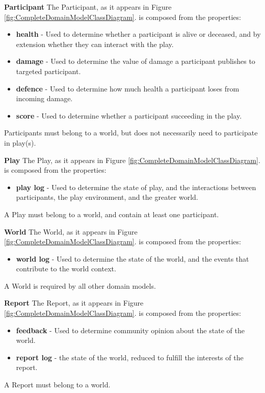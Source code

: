 \textbf{Participant}
\newline
The Participant, as it appears in Figure \ref{fig:CompleteDomainModelClassDiagram}. is composed from the properties:
\begin{itemize}
\item \textbf{health} - Used to determine whether a participant is alive or deceased, and by extension whether they can interact with the play. 
\item \textbf{damage} - Used to determine the value of damage a participant publishes to targeted participant.
\item \textbf{defence} - Used to determine how much health a participant loses from incoming damage.
\item \textbf{score} - Used to determine whether a participant succeeding in the play.
\end{itemize}
Participants must belong to a world, but does not necessarily need to participate in play(s).
\newline

\textbf{Play}
\newline
The Play, as it appears in Figure \ref{fig:CompleteDomainModelClassDiagram}. is composed from the properties:
\begin{itemize}
\item \textbf{play log} - Used to determine the state of play, and the interactions between participants, the play environment, and the greater world.
\end{itemize}
A Play must belong to a world, and contain at least one participant.
\newline

\textbf{World}
\newline
The World, as it appears in Figure \ref{fig:CompleteDomainModelClassDiagram}. is composed from the properties:
\begin{itemize}
\item \textbf{world log} - Used to determine the state of the world, and the events that contribute to the world context.
\end{itemize}
A World is required by all other domain models.
\newline

\textbf{Report}
\newline
The Report, as it appears in Figure \ref{fig:CompleteDomainModelClassDiagram}. is composed from the properties:
\begin{itemize}
\item \textbf{feedback} - Used to determine community opinion about the state of the world. 
\item \textbf{report log} - the state of the world, reduced to fulfill the interests of the report.
\end{itemize}
A Report must belong to a world.
\newline


